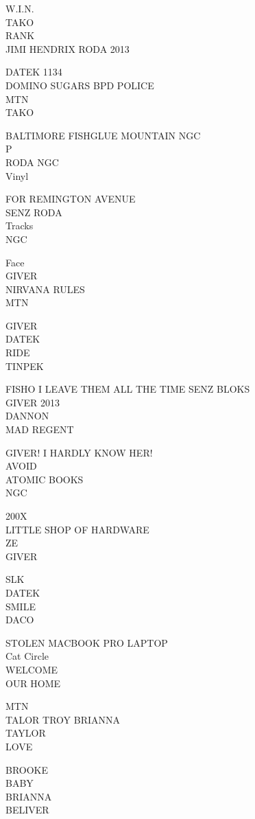 \documentclass[10pt,letterpaper]{article}
\begin{document}
W.I.N.\\
TAKO\\
RANK\\
JIMI HENDRIX RODA 2013

DATEK 1134\\
DOMINO SUGARS BPD POLICE\\
MTN\\
TAKO

BALTIMORE FISHGLUE MOUNTAIN NGC\\
P\\
RODA NGC\\
Vinyl

FOR REMINGTON AVENUE\\
SENZ RODA\\
Tracks\\
NGC

Face\\
GIVER\\
NIRVANA RULES\\
MTN

GIVER\\
DATEK\\
RIDE\\
TINPEK

FISHO I LEAVE THEM ALL THE TIME SENZ BLOKS\\
GIVER 2013\\
DANNON\\
MAD REGENT

GIVER!  I HARDLY KNOW HER!\\
AVOID\\
ATOMIC BOOKS\\
NGC

200X\\
LITTLE SHOP OF HARDWARE\\
ZE\\
GIVER

SLK\\
DATEK\\
SMILE\\
DACO

STOLEN MACBOOK PRO LAPTOP\\
Cat Circle\\
WELCOME\\
OUR HOME

MTN\\
TALOR TROY BRIANNA\\
TAYLOR\\
LOVE

BROOKE\\
BABY\\
BRIANNA\\
BELIVER
\end{document}
